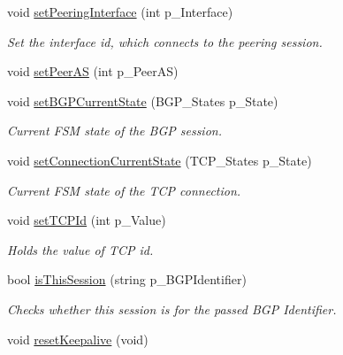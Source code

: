 \begin{DoxyCompactItemize}
void \hyperlink{classBGPSession_a7d3b4d6edbbf7bdfdd4150a10409564e}{set\-Peering\-Interface} (int p\-\_\-\-Interface)
\begin{DoxyCompactList}\small\item\em Set the interface id, which connects to the peering session. \end{DoxyCompactList}\item 
void \hyperlink{classBGPSession_af8838f841253356037b6d5e611f206ef}{set\-Peer\-A\-S} (int p\-\_\-\-Peer\-A\-S)
\item 
void \hyperlink{classBGPSession_acc7708be73adcedcbe269f2607d3184b}{set\-B\-G\-P\-Current\-State} (B\-G\-P\-\_\-\-States p\-\_\-\-State)
\begin{DoxyCompactList}\small\item\em Current F\-S\-M state of the B\-G\-P session. \end{DoxyCompactList}\item 
void \hyperlink{classBGPSession_a57a04a9247a8e5d04b393c6337958fb8}{set\-Connection\-Current\-State} (T\-C\-P\-\_\-\-States p\-\_\-\-State)
\begin{DoxyCompactList}\small\item\em Current F\-S\-M state of the T\-C\-P connection. \end{DoxyCompactList}\item 
void \hyperlink{classBGPSession_a70ec19b4e144f4785d7a3a9832c9b9ff}{set\-T\-C\-P\-Id} (int p\-\_\-\-Value)
\begin{DoxyCompactList}\small\item\em Holds the value of T\-C\-P id. \end{DoxyCompactList}\item 
bool \hyperlink{classBGPSession_a3ebc5dccec6c6655f24db4688869e17e}{is\-This\-Session} (string p\-\_\-\-B\-G\-P\-Identifier)
\begin{DoxyCompactList}\small\item\em Checks whether this session is for the passed B\-G\-P Identifier. \end{DoxyCompactList}\item 
\hypertarget{classBGPSession_ac6154f24eb86a2a724681f15cc66f793}{void \hyperlink{classBGPSession_ac6154f24eb86a2a724681f15cc66f793}{reset\-Keepalive} (void)}\label{classBGPSession_ac6154f24eb86a2a724681f15cc66f793}


\end{DoxyCompactItemize}
